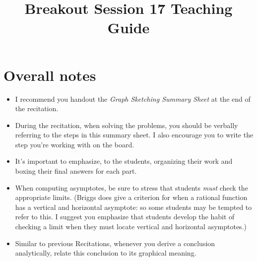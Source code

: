 \documentclass[handout,nooutcomes]{ximera}
\title{Breakout Session 17 Teaching Guide}
\begin{document}
\begin{abstract}

  
\end{abstract}
\maketitle

\section{Overall notes}
\begin{itemize}
  \item 
    I recommend you handout the \textsl{Graph Sketching Summary Sheet} at the end of the recitation.
    
  \item
    During the recitation, when solving the problems, you should be verbally referring to the steps in this summary sheet.
    I also encourage you to write the step you're working with on the board.

  \item 
    It's important to emphasize, to the students, organizing their work and boxing their final answers for each part.

  \item 
    When computing asymptotes, be sure to stress that students \textit{must} check the appropriate limits.
    (Briggs does give a criterion for when a rational function has a vertical and horizontal asymptote: so some students may be tempted to refer to this.
    I suggest you emphasize that students develop the habit of checking a limit when they must locate vertical and horizontal asymptotes.)

  \item 
    Similar to previous Recitations, whenever you derive a conclusion analytically, relate this conclusion to its graphical meaning.
\end{itemize}
\end{document}
